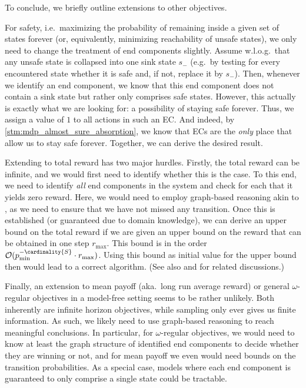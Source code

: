 \documentclass{theoretics}
\newcommand{\States}{S}
\newcommand{\sinkstate}{s_-}
\begin{document}
\begin{remark}
	To conclude, we briefly outline extensions to other objectives.

	For safety, i.e.\ maximizing the probability of remaining inside a given set of states forever (or, equivalently, minimizing reachability of unsafe states), we only need to change the treatment of end components slightly.
	Assume w.l.o.g.\ that any unsafe state is collapsed into one sink state $\sinkstate$ (e.g.\ by testing for every encountered state whether it is safe and, if not, replace it by $\sinkstate$).
	Then, whenever we identify an end component, we know that this end component does not contain a sink state but rather only comprises safe states.
	However, this actually is exactly what we are looking for: a possibility of staying safe forever.
	Thus, we assign a value of $1$ to all actions in such an EC.
	And indeed, by \cref{stm:mdp_almost_sure_absorption}, we know that ECs are the \emph{only} place that allow us to stay safe forever.
	Together, we can derive the desired result.

	Extending to total reward has two major hurdles.
	Firstly, the total reward can be infinite, and we would first need to identify whether this is the case.
	To this end, we need to identify \emph{all} end components in the system and check for each that it yields zero reward.
	Here, we would need to employ graph-based reasoning akin to \cite{DBLP:conf/cav/AshokKW19}, as we need to ensure that we have not missed any transition.
	Once this is established (or guaranteed due to domain knowledge), we can derive an upper bound on the total reward if we are given an upper bound on the reward that can be obtained in one step $r_{\max}$.
	This bound is in the order $\mathcal{O}(p_{\min}^{-\cardinality{\States}} \cdot r_{\max})$.
	Using this bound as initial value for the upper bound then would lead to a correct algorithm.
	(See also \cite[Appendix~B]{DBLP:conf/cav/MeggendorferW24} and \cite[Section~4]{DBLP:journals/fmsd/ChenFKPS13} for related discussions.)

	Finally, an extension to mean payoff (aka.\ long run average reward) or general $\omega$-regular objectives in a model-free setting seems to be rather unlikely.
	Both inherently are infinite horizon objectives, while sampling only ever gives us finite information.
	As such, we likely need to use graph-based reasoning to reach meaningful conclusions.
	In particular, for $\omega$-regular objectives, we would need to know at least the graph structure of identified end components to decide whether they are winning or not, and for mean payoff we even would need bounds on the transition probabilities.
	As a special case, models where each end component is guaranteed to only comprise a single state could be tractable.
\end{remark}
\end{document}
